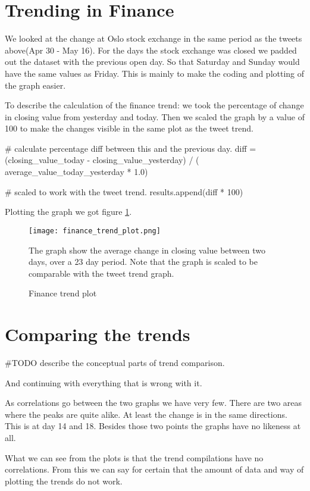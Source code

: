 \section{Trending in Finance}\label{trend:trends_in_finance}
We looked at the change at Oslo stock exchange in the same period as the tweets
above(Apr 30 - May 16). For the days the stock exchange was closed we padded out
the dataset with the previous open day. So that Saturday and Sunday would have
the same values as Friday. This is mainly to make the coding and plotting of
the graph easier. 

To describe the calculation of the finance trend: we took the percentage of
change in closing value from yesterday and today. Then we scaled the graph by a
value of 100 to make the changes visible in the same plot as the tweet trend.
\begin{python}
# calculate percentage diff between this and the previous day.
diff = (closing_value_today - closing_value_yesterday) / (
    average_value_today_yesterday * 1.0)

# scaled to work with the tweet trend.
results.append(diff * 100)
\end{python}

Plotting the graph we got figure \ref{fig:trend_finance_plot}.
\begin{figure}[htb]
    \centering
    \texttt{[image: finance\_trend\_plot.png]}
    \label{fig:trend_finance_plot}
    \caption{Finance trend plot}
The graph show the average change in closing value between two days, over a 23 day period. Note that the graph is scaled to be comparable with the tweet trend graph. 
\end{figure}
%

\section{Comparing the trends}\label{trend:compared}
#TODO describe the conceptual parts of trend comparison. 

And continuing with everything that is wrong with it. 

As correlations go between the two graphs we have very few. There are two areas
where the peaks are quite alike. At least the change is in the same directions.
This is at day 14 and 18. Besides those two points the graphs have no likeness
at all.  

What we can see from the plots is that the trend compilations have no
correlations. From this we can say for certain that the amount of data and way
of plotting the trends do not work.

